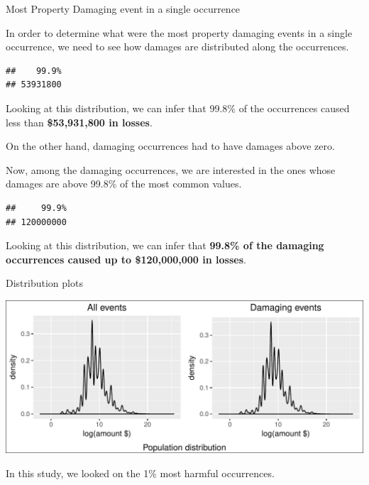 \documentclass[]{article}
\begin{document}
Most Property Damaging event in a single occurrence

In order to determine what were the most property damaging events in a
single occurrence, we need to see how damages are distributed along the
occurrences.

\begin{verbatim}
##    99.9% 
## 53931800
\end{verbatim}

Looking at this distribution, we can infer that 99.8\% of the
occurrences caused less than \textbf{\$53,931,800 in losses}.

On the other hand, damaging occurrences had to have damages above zero.

Now, among the damaging occurrences, we are interested in the ones whose
damages are above 99.8\% of the most common values.

\begin{verbatim}
##     99.9% 
## 120000000
\end{verbatim}

Looking at this distribution, we can infer that \textbf{99.8\% of the
damaging occurrences caused up to \$120,000,000 in losses}.

Distribution plots

\includegraphics{readme_files/figure-latex/crop-distribution-1.pdf}

In this study, we looked on the 1\% most harmful occurrences.
\end{document}
